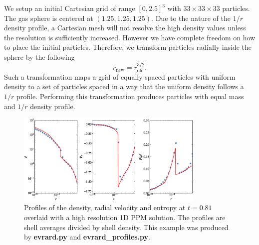 We setup an initial Cartesian grid of range $[0,2.5]^3$ with $33\times 33\times 33$ particles.
The gas sphere is centered at $(1.25, 1.25, 1.25)$. Due 
to the nature of the $1/r$ density profile, a Cartesian mesh will not resolve the high density 
values unless the resolution is sufficiently increased. However we have complete freedom on how
to place the initial particles. Therefore, we transform particles radially inside the sphere by 
the following
\begin{equation}
    r_{\mathrm{new}} = r_{\mathrm{old}}^{3/2}.
\end{equation}
Such a transformation maps a grid of equally spaced particles with uniform density to
a set of particles spaced in a way that the uniform density follows a $1/r$ profile.
Performing this transformation produces particles with equal mass and $1/r$ density profile.
\begin{figure}
    \begin{center}
        \includegraphics[width=0.8\textwidth]{figures/evrard.eps}
        \caption{Profiles of the density, radial velocity and entropy at $t=0.81$ overlaid
        with a high resolution 1D PPM solution. The profiles are shell averages divided by 		
        shell density. This example was produced by \textbf{evrard.py} and 
        \textbf{evrard\_profiles.py}.}
        \label{fig.evrard}
    \end{center}
\end{figure}


